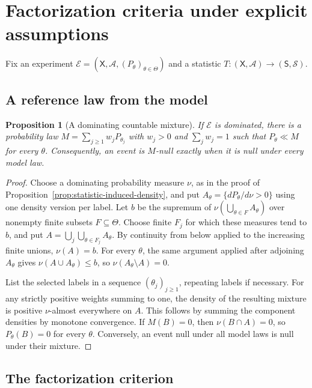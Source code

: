 \documentclass[11pt,oneside]{book}
\newtheorem{proposition}[theorem]{Proposition}
\theoremstyle{definition}
\theoremstyle{remark}
\begin{document}
\clearpage
\section{Factorization criteria under explicit assumptions}
\label{sec:sufficiency-factorization}

Fix an experiment $\mathcal E=(\mathsf X,\mathcal A,
(P_\theta)_{\theta\in\Theta})$ and a statistic
$T:(\mathsf X,\mathcal A)\to(\mathsf S,\mathcal S)$.

\subsection{A reference law from the model}
\label{subsec:sufficiency-reference-mixture}

\begin{proposition}[A dominating countable mixture]
\label{prop:dominating-countable-mixture}
If $\mathcal E$ is dominated, there is a probability law
$M=\sum_{j\geq1}w_jP_{\theta_j}$ with $w_j>0$ and $\sum_jw_j=1$
such that $P_\theta\ll M$ for every $\theta$.
Consequently, an event is $M$-null exactly when it is null
under every model law.
\end{proposition}
\begin{proof}
Choose a dominating probability measure $\nu$, as in the proof of
Proposition~\ref{prop:statistic-induced-density}, and put
$A_\theta=\{dP_\theta/d\nu>0\}$ using one density version per label.
Let $b$ be the supremum of $\nu(\bigcup_{\theta\in F}A_\theta)$ over
nonempty finite subsets $F\subseteq\Theta$. Choose finite $F_j$ for
which these measures tend to $b$, and put
$A=\bigcup_j\bigcup_{\theta\in F_j}A_\theta$.
By continuity from below applied to the increasing finite unions,
$\nu(A)=b$. For every $\theta$, the same argument applied after
adjoining $A_\theta$ gives $\nu(A\cup A_\theta)\leq b$, so
$\nu(A_\theta\setminus A)=0$.

List the selected labels in a sequence $(\theta_j)_{j\geq1}$,
repeating labels if necessary. For any strictly positive weights
summing to one, the density of the resulting mixture is positive
$\nu$-almost everywhere on $A$. This follows by summing the
component densities by monotone convergence. If $M(B)=0$, then
$\nu(B\cap A)=0$, so $P_\theta(B)=0$ for every $\theta$.
Conversely, an event null under all model laws is null under their
mixture.
\end{proof}

\subsection{The factorization criterion}
\label{subsec:fisher-neyman-factorization}
\end{document}
